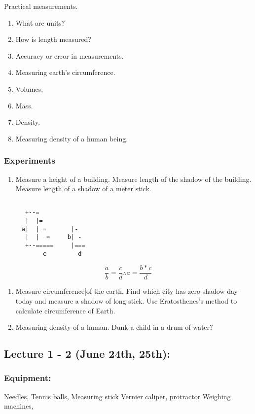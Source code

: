 \documentclass[11pt]{article}
\begin{document}
Practical measurements.


\begin{enumerate}
\item What are units?
\item How is length measured?
\item Accuracy or error in measurements.
\item Measuring earth's circumference.
\item Volumes.
\item Mass.
\item Density.
\item Measuring density of a human being.
\end{enumerate}

\subsubsection{Experiments}
\label{sec:org68e4647}
\begin{enumerate}
\item Measure a height of a building.
Measure length of the shadow of the building.
Measure length of a shadow of a meter stick.
\end{enumerate}
\begin{verbatim}

      +--=
      |  |=
     a|  | =       |-
      |  |  =     b| -
      +--=====     |===
           c         d

\end{verbatim}
\[
   \frac{a}{b} = \frac{c}{d} \therefore a = \frac{b * c}{d}
   \]

\begin{enumerate}
\item Measure circumference|of the earth.
Find which city has zero shadow day today and measure a shadow of long stick.
Use Eratosthenes's method to calculate circumference of Earth.

\item Measuring density of a human.
Dunk a child in a drum of water?
\end{enumerate}




\subsection{Lecture 1 - 2 (June 24th, 25th):}
\label{sec:orgd981096}
\subsubsection{Equipment:}
\label{sec:org254c6b5}
Needles, Tennis balls, Measuring stick
Vernier caliper, protractor
Weighing machines,
\end{document}
